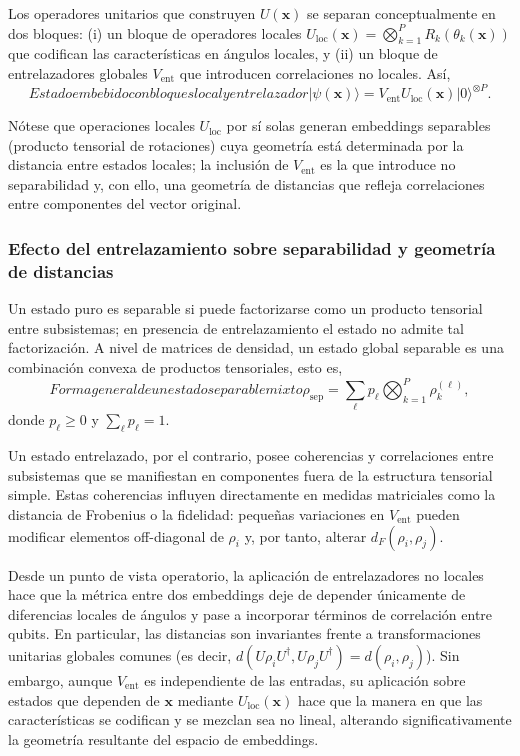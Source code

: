 Los operadores unitarios que construyen $U(\mathbf{x})$ se separan conceptualmente en dos bloques: (i) un bloque de operadores locales $U_{\mathrm{loc}}(\mathbf{x})=\bigotimes_{k=1}^P R_k(\theta_k(\mathbf{x}))$ que codifican las características en ángulos locales, y (ii) un bloque de entrelazadores globales $V_{\mathrm{ent}}$ que introducen correlaciones no locales. Así,
\begin{equation}[eq:estado_feature_map_entrelazado]{Estado embebido con bloques local y entrelazador}
\lvert\psi(\mathbf{x})\rangle = V_{\mathrm{ent}} U_{\mathrm{loc}}(\mathbf{x})\lvert 0\rangle^{\otimes P}.
\end{equation}

Nótese que operaciones locales $U_{\mathrm{loc}}$ por sí solas generan embeddings separables (producto tensorial de rotaciones) cuya geometría está determinada por la distancia entre estados locales; la inclusión de $V_{\mathrm{ent}}$ es la que introduce no separabilidad y, con ello, una geometría de distancias que refleja correlaciones entre componentes del vector original.

\subsubsection{Efecto del entrelazamiento sobre separabilidad y geometría de distancias}

Un estado puro es separable si puede factorizarse como un producto tensorial entre subsistemas; en presencia de entrelazamiento el estado no admite tal factorización. A nivel de matrices de densidad, un estado global separable es una combinación convexa de productos tensoriales, esto es,
\begin{equation}[eq:estado_separable_mixto]{Forma general de un estado separable mixto}
\rho_{\mathrm{sep}} = \sum_{\ell} p_{\ell} \bigotimes_{k=1}^P \rho_k^{(\ell)},
\end{equation}
donde $p_{\ell}\geq 0$ y $\sum_{\ell}p_{\ell}=1$.

Un estado entrelazado, por el contrario, posee coherencias y correlaciones entre subsistemas que se manifiestan en componentes fuera de la estructura tensorial simple. Estas coherencias influyen directamente en medidas matriciales como la distancia de Frobenius o la fidelidad: pequeñas variaciones en $V_{\mathrm{ent}}$ pueden modificar elementos off-diagonal de $\rho_i$ y, por tanto, alterar $d_F(\rho_i,\rho_j)$.

Desde un punto de vista operatorio, la aplicación de entrelazadores no locales hace que la métrica entre dos embeddings deje de depender únicamente de diferencias locales de ángulos y pase a incorporar términos de correlación entre qubits. En particular, las distancias son invariantes frente a transformaciones unitarias globales comunes (es decir, $d(U\rho_i U^{\dagger}, U\rho_j U^{\dagger})=d(\rho_i,\rho_j)$). Sin embargo, aunque $V_{\mathrm{ent}}$ es independiente de las entradas, su aplicación sobre estados que dependen de $\mathbf{x}$ mediante $U_{\mathrm{loc}}(\mathbf{x})$ hace que la manera en que las características se codifican y se mezclan sea no lineal, alterando significativamente la geometría resultante del espacio de embeddings.

